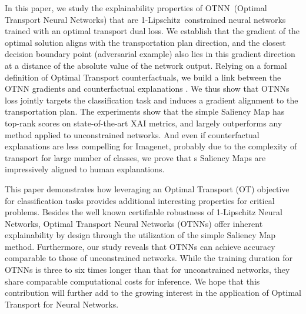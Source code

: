 In this paper, we study the explainability properties of OTNN~(Optimal Transport Neural Networks) 
that are 1-Lipschitz~constrained neural networks trained with an optimal transport dual loss. 
We establish that the gradient of the optimal solution aligns with the transportation plan direction,
and the closest decision boundary point (adversarial example) also lies in this gradient direction at a distance of the absolute value of the network output.  
Relying on a formal definition of Optimal Transport counterfactuals, we build a link between the OTNN gradients and counterfactual explanations
. We thus show that
OTNNs loss jointly targets the classification task and induces a gradient alignment to the transportation plan. 
The experiments show that the simple Saliency Map has top-rank scores on state-of-the-art XAI metrics, and largely outperforms any method applied to unconstrained networks. 
And even if counterfactual explanations are less compelling for Imagenet, probably due to the complexity of transport for 
large number of classes,
 we prove that \otnn s Saliency Maps are impressively aligned to human explanations. 

This paper demonstrates how leveraging an Optimal Transport (OT) objective for classification tasks provides additional interesting properties for critical problems. 
Besides the well known certifiable robustness of 1-Lipschitz Neural Networks, Optimal Transport Neural Networks (OTNNs) offer inherent explainability by design through the utilization of the simple Saliency Map method.
Furthermore, our study reveals that OTNNs can achieve accuracy comparable to those of unconstrained networks.
While the training duration for OTNNs is three to six times longer than that for unconstrained networks, they share comparable computational costs for inference. We hope that this contribution will further add to the growing interest in the application of Optimal Transport for Neural Networks.


